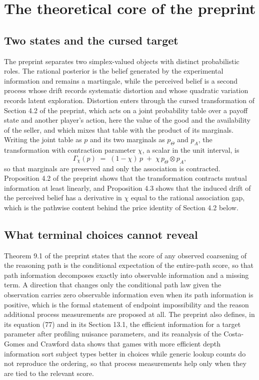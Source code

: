 \documentclass[11pt,a4paper]{article}
\begin{document}
\section{The theoretical core of the preprint}

\subsection{Two states and the cursed target}

The preprint separates two simplex-valued objects with distinct probabilistic roles. The rational posterior is the belief generated by the experimental information and remains a martingale, while the perceived belief is a second process whose drift records systematic distortion and whose quadratic variation records latent exploration. Distortion enters through the cursed transformation of Section 4.2 of the preprint, which acts on a joint probability table over a payoff state and another player's action, here the value of the good and the availability of the seller, and which mixes that table with the product of its marginals. Writing the joint table as $p$ and its two marginals as $p_{\Theta}$ and $p_{A}$, the transformation with contraction parameter $\chi$, a scalar in the unit interval, is
\[
\Gamma_{\chi}(p) \;=\; (1-\chi)\,p \;+\; \chi\, p_{\Theta}\otimes p_{A},
\]
so that marginals are preserved and only the association is contracted. Proposition 4.2 of the preprint shows that the transformation contracts mutual information at least linearly, and Proposition 4.3 shows that the induced drift of the perceived belief has a derivative in $\chi$ equal to the rational association gap, which is the pathwise content behind the price identity of Section 4.2 below.

\subsection{What terminal choices cannot reveal}

Theorem 9.1 of the preprint states that the score of any observed coarsening of the reasoning path is the conditional expectation of the entire-path score, so that path information decomposes exactly into observable information and a missing term. A direction that changes only the conditional path law given the observation carries zero observable information even when its path information is positive, which is the formal statement of endpoint impossibility and the reason additional process measurements are proposed at all. The preprint also defines, in its equation (77) and in its Section 13.1, the efficient information for a target parameter after profiling nuisance parameters, and its reanalysis of the Costa-Gomes and Crawford data shows that games with more efficient depth information sort subject types better in choices while generic lookup counts do not reproduce the ordering, so that process measurements help only when they are tied to the relevant score.
\end{document}

